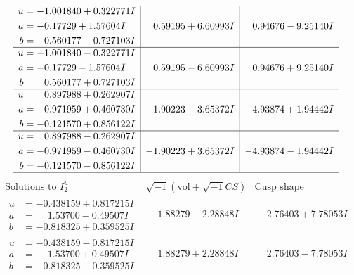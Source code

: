 \documentclass[1p]{elsarticle_modified}
\theoremstyle{definition}
\newcommand{\I}{\sqrt{-1}}
\begin{document}
$$\begin{array}{c|c|c}
\begin{aligned}
u &= -1.001840 + 0.322771 I \\
a &= -0.17729 + 1.57604 I \\
b &= \phantom{-}0.560177 - 0.727103 I\end{aligned}
 & \phantom{-}0.59195 + 6.60993 I & \phantom{-}0.94676 - 9.25140 I \\ \hline\begin{aligned}
u &= -1.001840 - 0.322771 I \\
a &= -0.17729 - 1.57604 I \\
b &= \phantom{-}0.560177 + 0.727103 I\end{aligned}
 & \phantom{-}0.59195 - 6.60993 I & \phantom{-}0.94676 + 9.25140 I \\ \hline\begin{aligned}
u &= \phantom{-}0.897988 + 0.262907 I \\
a &= -0.971959 + 0.460730 I \\
b &= -0.121570 + 0.856122 I\end{aligned}
 & -1.90223 - 3.65372 I & -4.93874 + 1.94442 I \\ \hline\begin{aligned}
u &= \phantom{-}0.897988 - 0.262907 I \\
a &= -0.971959 - 0.460730 I \\
b &= -0.121570 - 0.856122 I\end{aligned}
 & -1.90223 + 3.65372 I & -4.93874 - 1.94442 I\\
 \hline 
 \end{array}$$\newpage$$\begin{array}{c|c|c}  
\text{Solutions to }I^u_{2}& \I (\text{vol} + \sqrt{-1}CS) & \text{Cusp shape}\\
 \hline 
\begin{aligned}
u &= -0.438159 + 0.817215 I \\
a &= \phantom{-}1.53700 - 0.49507 I \\
b &= -0.818325 + 0.359525 I\end{aligned}
 & \phantom{-}1.88279 - 2.28848 I & \phantom{-}2.76403 + 7.78053 I \\ \hline\begin{aligned}
u &= -0.438159 - 0.817215 I \\
a &= \phantom{-}1.53700 + 0.49507 I \\
b &= -0.818325 - 0.359525 I\end{aligned}
 & \phantom{-}1.88279 + 2.28848 I & \phantom{-}2.76403 - 7.78053 I \\ \hline\begin{aligned}

\end{aligned}
\end{array}$$
\end{document}
